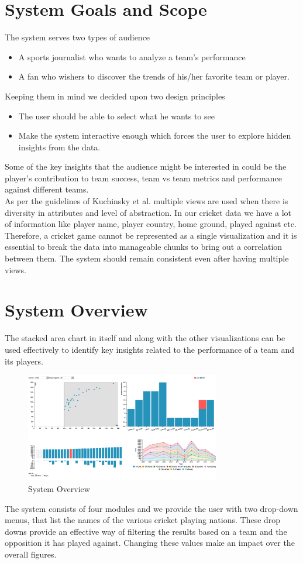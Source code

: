 \documentclass[letterpaper, 10 pt, conference]{ieeeconf}  %
\begin{document}
\section{System Goals and Scope}
\noindent The system serves two types of audience
\begin{itemize}
\item A sports journalist who wants to analyze a team's performance
\item A fan who wishers to discover the trends of his/her favorite team or player.
\end{itemize}
Keeping them in mind we decided upon two design principles
\begin{itemize}
\item The user should be able to select what he wants to see
\item Make the system interactive enough which forces the user to explore hidden insights from the data.
\end{itemize}
Some of the key insights that the audience might be interested in could be the player's contribution to team success, team vs team metrics and performance against different teams.\\
\noindent As per the guidelines of Kuchinsky et al. \cite{kentucky} multiple views are used when there is diversity in attributes and level of abstraction. In our cricket data we have a lot of information like player name, player country, home ground, played against etc. Therefore, a cricket game cannot be represented as a single visualization and it is essential to break the data into manageable chunks to bring out a correlation between them. The system should remain consistent even after having multiple views.

\section{System Overview}
The stacked area chart in itself and along with the other visualizations can be used effectively to identify key insights related to the performance of a team and its players.
\begin{figure}[!ht]
\centering
\includegraphics[width= 8.5cm]{case4.png}
\caption{System Overview}
\end{figure}
The system consists of four modules and we provide the user with two drop-down menus, that list the names of the various cricket playing nations. These drop downs provide an effective way of filtering the results based on a team and the opposition it has played against. Changing these values make an impact over the overall figures.
\end{document}
